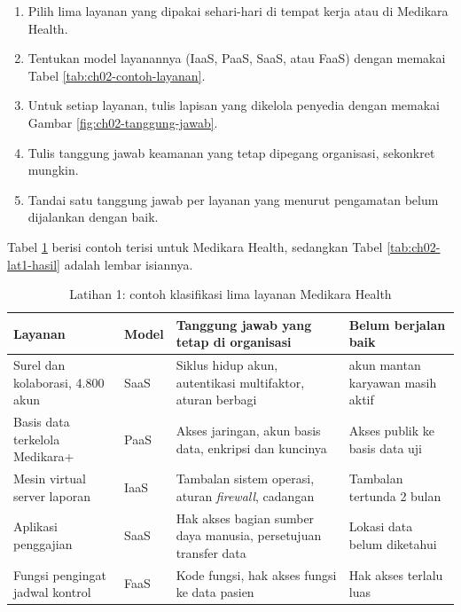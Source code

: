 \begin{enumerate}
  \item Pilih lima layanan yang dipakai sehari-hari di tempat kerja atau di Medikara Health.
  \item Tentukan model layanannya (IaaS, PaaS, SaaS, atau FaaS) dengan memakai Tabel
        \ref{tab:ch02-contoh-layanan}.
  \item Untuk setiap layanan, tulis lapisan yang dikelola penyedia dengan memakai Gambar
        \ref{fig:ch02-tanggung-jawab}.
  \item Tulis tanggung jawab keamanan yang tetap dipegang organisasi, sekonkret mungkin.
  \item Tandai satu tanggung jawab per layanan yang menurut pengamatan belum dijalankan
        dengan baik.
\end{enumerate}

Tabel \ref{tab:ch02-lat1-contoh} berisi contoh terisi untuk Medikara Health, sedangkan
Tabel \ref{tab:ch02-lat1-hasil} adalah lembar isiannya.

\begin{table}[!htb]
  \centering
  \caption{Latihan 1: contoh klasifikasi lima layanan Medikara Health}
  \label{tab:ch02-lat1-contoh}
  \small
  \begin{tabularx}{\textwidth}{>{\raggedright\arraybackslash}p{2.6cm}
      >{\raggedright\arraybackslash}p{1.1cm} >{\raggedright\arraybackslash}X
      >{\raggedright\arraybackslash}p{2.6cm}}
    \hline
    \textbf{Layanan} & \textbf{Model} & \textbf{Tanggung jawab yang tetap di organisasi} &
      \textbf{Belum berjalan baik} \\
    \hline
    Surel dan kolaborasi, 4.800 akun & SaaS & Siklus hidup akun, autentikasi multifaktor,
      aturan berbagi & 312 akun mantan karyawan masih aktif \\
    \hline
    Basis data terkelola Medikara+ & PaaS & Akses jaringan, akun basis data, enkripsi dan
      kuncinya & Akses publik ke basis data uji \\
    \hline
    Mesin virtual server laporan & IaaS & Tambalan sistem operasi, aturan \textit{firewall},
      cadangan & Tambalan tertunda 2 bulan \\
    \hline
    Aplikasi penggajian & SaaS & Hak akses bagian sumber daya manusia, persetujuan transfer
      data & Lokasi data belum diketahui \\
    \hline
    Fungsi pengingat jadwal kontrol & FaaS & Kode fungsi, hak akses fungsi ke data pasien &
      Hak akses terlalu luas \\
    \hline
  \end{tabularx}
\end{table}

